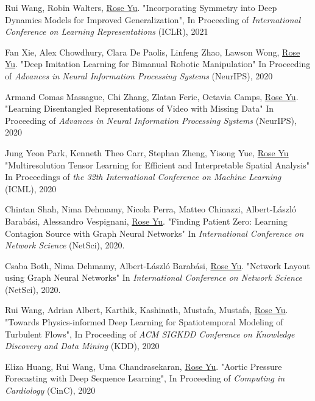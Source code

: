 \documentclass[margin,line]{res}
\begin{document}
\begin{resume}
\begin{enumerate}[label={[C\arabic*]}]
\item  Rui Wang, Robin Walters, \underline{Rose Yu}.  "Incorporating Symmetry into Deep Dynamics Models for Improved Generalization", In Proceeding of  \textit{International Conference on Learning Representations} (ICLR), 2021

\item Fan Xie,  Alex  Chowdhury, Clara De Paolis, Linfeng Zhao, Lawson Wong,  \underline{Rose Yu}.
"Deep Imitation Learning for Bimanual  Robotic Manipulation"
  In Proceeding of \textit{Advances in Neural Information Processing Systems} (NeurIPS), 2020
  
\item Armand Comas Massague, Chi Zhang, Zlatan Feric, Octavia Camps,  \underline{Rose Yu}.
"Learning Disentangled Representations of Video with Missing Data"
  In  Proceeding of \textit{Advances in Neural Information Processing Systems} (NeurIPS), 2020
 
      
\item Jung Yeon Park, Kenneth Theo Carr, Stephan Zheng, Yisong Yue, \underline{Rose Yu}
"Multiresolution Tensor Learning for Efficient and Interpretable Spatial Analysis"
 In Proceedings  of  \textit{the 32th International Conference on Machine Learning} (ICML), 2020
  
\item Chintan Shah, Nima Dehmamy, Nicola Perra, Matteo Chinazzi, Albert-László Barabási, Alessandro Vespignani, \underline{Rose Yu}.
"Finding Patient Zero: Learning Contagion Source with Graph Neural Networks"
 In \textit{International Conference on Network Science} (NetSci),  2020. 
     
 \item Csaba Both, Nima Dehmamy,  Albert-László Barabási, \underline{Rose Yu}.
"Network Layout using Graph Neural Networks"
 In \textit{International Conference on Network Science} (NetSci),  2020.  

\item Rui Wang, Adrian Albert,  Karthik, Kashinath, Mustafa, Mustafa,  \underline{Rose Yu}. "Towards Physics-informed Deep Learning for Spatiotemporal Modeling of Turbulent Flows", In  Proceeding of\textit{ ACM SIGKDD Conference on Knowledge Discovery and Data Mining} (KDD), 2020

\item Eliza Huang, Rui Wang, Uma Chandrasekaran, \underline{Rose Yu}.  "Aortic Pressure Forecasting with Deep Sequence Learning", In  Proceeding of  \textit{Computing in Cardiology} (CinC), 2020 


\end{enumerate}
\end{resume}
\end{document}
